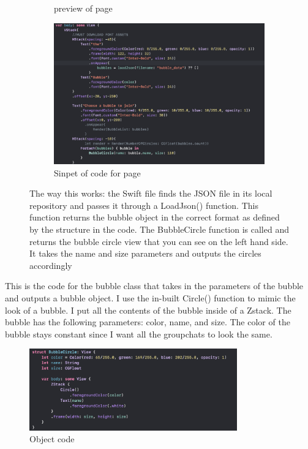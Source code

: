 \documentclass[a4paper, 11pt]{report}
\begin{document}
\begin{figure}
\begin{subfigure}[h]{0.3\textwidth}
  \caption{preview of page}
  \label{fig:image1}
\end{subfigure}
\hfill
\begin{subfigure}[h]{0.7\textwidth}
  \includegraphics[width=\textwidth]{viewbubble.png}
  \caption{Sinpet of code for page}
  \label{fig:image2}
\end{subfigure}
\caption{
The way this works: the Swift file finds the JSON file in its local repository and passes it through a LoadJson() function. This function returns the bubble object in the correct format as defined by the structure in the code.
The BubbleCircle function is called and returns the bubble circle view that you can see on the left hand side. It takes the name and size parameters and outputs the circles accordingly
}
  \label{fig:images}
 
\end{figure}

\newpage
This is the code for the bubble class that takes in the parameters of the bubble and outputs a bubble object. I use the in-built Circle() function to mimic the look of a bubble. I put all the contents of the bubble inside of a Zstack. The bubble has the following parameters: color, name, and size. The color of the bubble stays constant since I want all the groupchats to look the same.
\\
\begin{figure}[ht]
 \centering
 \includegraphics[width=0.8\textwidth]{BubbleObject}
 \caption{Object code}
 \label{fig:example}
\end{figure}
\end{document}
